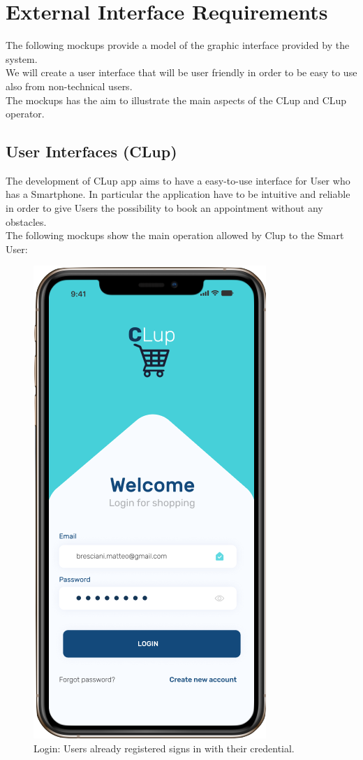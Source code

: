 \section{External Interface Requirements}
The following mockups provide a model of the graphic interface provided by the system. \\
We will create a user interface that will be user friendly in order to be easy to use also from non-technical users. \\
The mockups has the aim to illustrate the main aspects of the CLup and CLup operator.
\subsection{User Interfaces (CLup)}
The development of CLup app aims to have a easy-to-use interface for User who has a Smartphone. In particular the application have to be intuitive and reliable in order to give Users the possibility to book an appointment without any obstacles.\\
The following mockups show the main operation allowed by Clup to the Smart User:
\begin{figure}[h]
  \caption{Login: Users already registered signs in with their credential.}
  \label{fig: Login}
  \centering
  \includegraphics[scale=0.35]{images/mockup/login.png}
\end{figure}
